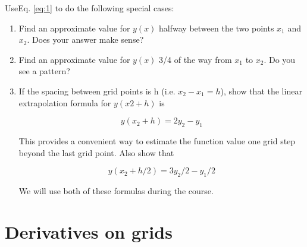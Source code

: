     \begin{problem} \label{P1.3} UseEq. \ref{eq:1} to do the following special cases:
     
     \begin{enumerate}[label=(\alph*)]
     
     	\item Find an approximate value for $y(x)$ halfway between the two points $x_1$ and $x_2$. Does your answer make sense?
     	
     	\item Find an approximate value for $y(x)$ 3/4 of the way from $x_1$ to $x_2$. Do you see a pattern?
     	
     
     	\item If the spacing between grid points is h (i.e. $x_2 − x_1 = h$), show that the linear extrapolation formula for $y(x2+h)$ is
     	
     	\begin{equation} \label{eq:2}
     		y(x_2 + h) = 2y_2 - y_1
     	\end{equation}
     	
     	This provides a convenient way to estimate the function value one grid step beyond the last grid point. Also show that
     	
     	\begin{equation} \label{eq:3}
     		y(x_2 + h/2) = 3y_2/2 - y_1/2
     	\end{equation}
     	
     	We will use both of these formulas during the course.
     	
     \end{enumerate}
    \end{problem}
     \section*{Derivatives on grids}
     

